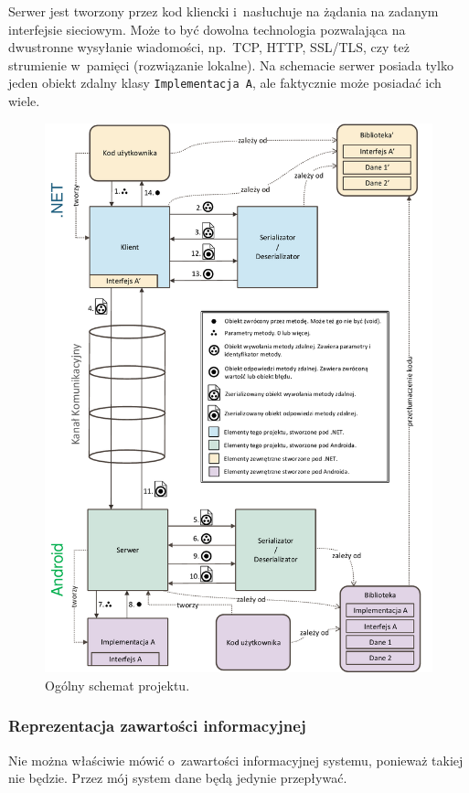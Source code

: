 Serwer jest tworzony przez kod kliencki i~nasłuchuje na żądania na zadanym interfejsie sieciowym. Może to być dowolna technologia pozwalająca na dwustronne wysyłanie wiadomości, np.\ TCP, HTTP, SSL/TLS, czy też strumienie w~pamięci (rozwiązanie lokalne).
Na schemacie serwer posiada tylko jeden obiekt zdalny klasy \texttt{Implementacja A}, ale faktycznie może posiadać ich wiele.

\begin{figure}
	\centering
		\includegraphics[scale=0.8]{img/schematy/schemat-dzialania-magisterki.pdf}
	\caption{Ogólny schemat projektu.}
	\label{fig:project-overview}
\end{figure}


\subsubsection{Reprezentacja zawartości informacyjnej}
Nie można właściwie mówić o~zawartości informacyjnej systemu, ponieważ takiej nie będzie.
Przez mój system dane będą jedynie przepływać.


